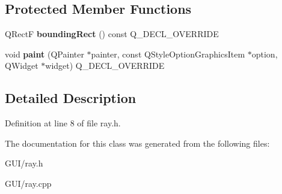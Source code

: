 \subsection*{Protected Member Functions}
\begin{DoxyCompactItemize}
\item 
\mbox{\label{class_ray_a838cae58a209ad9ec194e32343f9948d}} 
Q\+RectF {\bfseries bounding\+Rect} () const Q\+\_\+\+D\+E\+C\+L\+\_\+\+O\+V\+E\+R\+R\+I\+DE
\item 
\mbox{\label{class_ray_a0acc8ad9ecf0cce172f6f027598c3de4}} 
void {\bfseries paint} (Q\+Painter $\ast$painter, const Q\+Style\+Option\+Graphics\+Item $\ast$option, Q\+Widget $\ast$widget) Q\+\_\+\+D\+E\+C\+L\+\_\+\+O\+V\+E\+R\+R\+I\+DE
\end{DoxyCompactItemize}


\subsection{Detailed Description}


Definition at line 8 of file ray.\+h.



The documentation for this class was generated from the following files\+:\begin{DoxyCompactItemize}
\item 
G\+U\+I/ray.\+h\item 
G\+U\+I/ray.\+cpp\end{DoxyCompactItemize}
